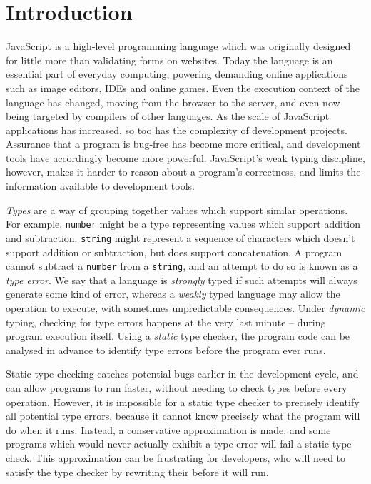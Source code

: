 \documentclass[12pt,a4paper,twoside,openright]{report}
\begin{document}
\chapter{Introduction}\label{introduction}

JavaScript is a high-level programming language which was originally designed
for little more than validating forms on websites. Today the language is an
essential part of everyday computing, powering demanding online applications
such as image editors, IDEs and online games. Even the execution context of the
language has changed, moving from the browser to the server, and even now being
targeted by compilers of other languages. As the scale of JavaScript
applications has increased, so too has the complexity of development projects.
Assurance that a program is bug-free has become more critical, and development
tools have accordingly become more powerful. JavaScript's weak typing
discipline, however, makes it harder to reason about a program's correctness,
and limits the information available to development tools.

\textit{Types} are a way of grouping together values which support similar
operations. For example, \texttt{number} might be a type representing values
which support addition and subtraction. \texttt{string} might represent a
sequence of characters which doesn't support addition or subtraction, but does
support concatenation. A program cannot subtract a \texttt{number} from a
\texttt{string}, and an attempt to do so is known as a \textit{type error}. We
say that a language is \textit{strongly} typed if such attempts will always
generate some kind of error, whereas a \textit{weakly} typed language may allow
the operation to execute, with sometimes unpredictable consequences. Under
\textit{dynamic} typing, checking for type errors happens at the very last
minute -- during program execution itself. Using a \textit{static} type
checker, the program code can be analysed in advance to identify type errors
before the program ever runs.

Static type checking catches potential bugs earlier in the development cycle,
and can allow programs to run faster, without needing to check types before
every operation. However, it is impossible for a static type checker to
precisely identify all potential type errors, because it cannot know precisely
what the program will do when it runs. %
Instead, a conservative approximation is made, and some programs which would
never actually exhibit a type error will fail a static type check. This
approximation can be frustrating for developers, who will need to satisfy the
type checker by rewriting their before it will run.
\end{document}
